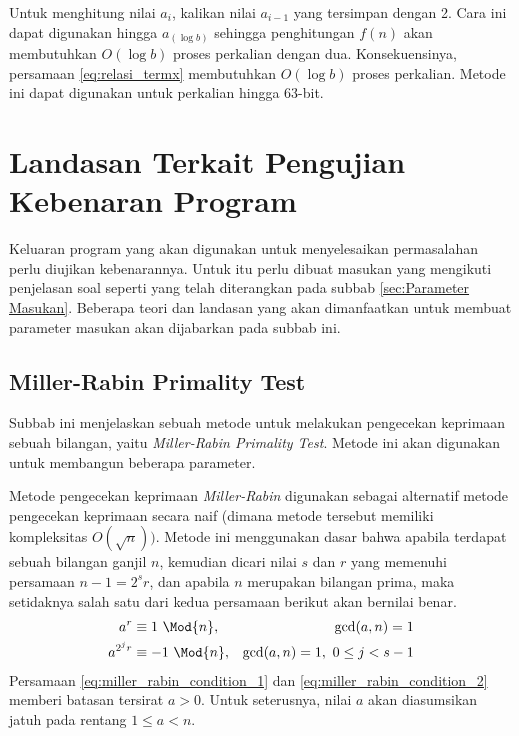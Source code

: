 Untuk menghitung nilai $ a_i $, kalikan nilai $ a_{i-1} $ yang tersimpan dengan 2. Cara ini dapat digunakan hingga $ a_{(\log b)} $ sehingga penghitungan $ f(n) $ akan membutuhkan $ O(\log b) $ proses perkalian dengan dua. Konsekuensinya, persamaan \eqref{eq:relasi_termx} membutuhkan $ O(\allowbreak\log b) $ proses perkalian. Metode ini dapat digunakan untuk perkalian hingga 63-bit.

\section{Landasan Terkait Pengujian Kebenaran Program}
Keluaran program yang akan digunakan untuk menyelesaikan permasalahan perlu diujikan kebenarannya. Untuk itu perlu dibuat masukan yang mengikuti penjelasan soal seperti yang telah diterangkan pada subbab \ref{sec:Parameter Masukan}. Beberapa teori dan landasan yang akan dimanfaatkan untuk membuat parameter masukan akan dijabarkan pada subbab ini.

\subsection{Miller-Rabin Primality Test}

Subbab ini menjelaskan sebuah metode untuk melakukan pengecekan keprimaan sebuah bilangan, yaitu \textit{Miller-Rabin Primality Test}. Metode ini akan digunakan untuk membangun beberapa parameter.

Metode pengecekan keprimaan \textit{Miller-Rabin} digunakan sebagai alternatif metode pengecekan keprimaan secara naif (dimana metode tersebut memiliki kompleksitas $ O(\sqrt{n})) $. Metode ini menggunakan dasar bahwa apabila terdapat sebuah bilangan ganjil $ n $, kemudian dicari nilai $ s $ dan $ r $ yang memenuhi persamaan $ n-1=2^{s} r $, dan apabila $ n $ merupakan bilangan prima, maka setidaknya salah satu dari kedua persamaan berikut akan bernilai benar. \cite{hac_publickey, stallings_cryptography}
\begin{align}
\label{eq:miller_rabin_condition_1}
a^r &\equiv 1\ \Mod{n}, & \gcd(a,n)=1 \\
\label{eq:miller_rabin_condition_2}
a^{2^j r} &\equiv -1\ \Mod{n}, & \gcd(a,n)=1,\ 0 \leq j <s-1
\end{align}
Persamaan \eqref{eq:miller_rabin_condition_1} dan \eqref{eq:miller_rabin_condition_2} memberi batasan tersirat $ a>0 $. Untuk seterusnya, nilai $ a $ akan diasumsikan jatuh pada rentang $ 1 \leq a < n $.

